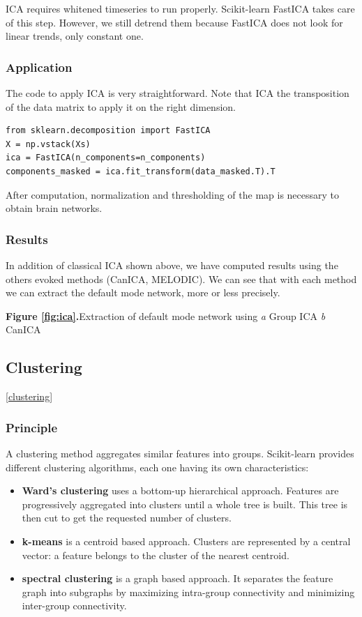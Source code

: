 \documentclass{frontiersSCNS} %
\newcommand{\alex}[1]{\todo[inline, color=green!40]{#1}}
\begin{document}
ICA requires whitened timeseries to run properly. Scikit-learn FastICA takes care
of this step. However, we still detrend them because
FastICA does not look for linear trends, only constant one.

\subsubsection{Application}


The code to apply ICA is very straightforward. Note that ICA 
the transposition of the data
matrix to apply it on the right dimension.

\begin{lstlisting}
from sklearn.decomposition import FastICA
X = np.vstack(Xs)
ica = FastICA(n_components=n_components)
components_masked = ica.fit_transform(data_masked.T).T
\end{lstlisting}

After computation, normalization and thresholding of the map is necessary to
obtain brain networks.

\subsubsection{Results}

In addition of classical ICA shown above, we have computed results using the
others evoked methods (CanICA, MELODIC). We can see that with each method we can
extract the default mode network, more or less precisely.

\textbf{Figure \ref{fig:ica}.}{Extraction of default mode network using \textit{a} Group ICA
  \textit{b} CanICA}\label{fig:03}

\alex{MELODIC is missing}

\subsection{Clustering}
\ref{clustering}
\subsubsection{Principle}

A clustering method aggregates similar features into groups. Scikit-learn
provides different clustering algorithms, each one having its own
characteristics:

\begin{itemize}
    \item{\bf Ward's clustering} uses a bottom-up hierarchical approach. Features are
        progressively aggregated into clusters until a whole tree is built. This
        tree is then cut to get the requested number of clusters.
    \item{\bf k-means} is a centroid based approach. Clusters are represented by
        a central vector: a feature belongs to the cluster of the nearest
        centroid.
    \item{\bf spectral clustering} is a graph based approach. It separates
        the feature graph into subgraphs by maximizing intra-group connectivity and
        minimizing inter-group connectivity.
\end{itemize}
\end{document}
